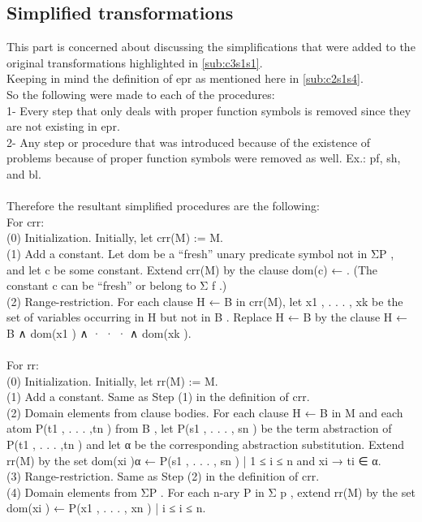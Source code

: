 \subsection{Simplified transformations}\label{sub:c3s1s2}

This part is concerned about discussing the simplifications that were added to the original transformations highlighted in \ref{sub:c3s1s1}.
\\
Keeping in mind the definition of \ac{epr} as mentioned here in \ref{sub:c2s1s4}.
\\
So the following were made to each of the procedures:
\\
1- Every step that only deals with proper function symbols is removed since they are not existing in \ac{epr}.
\\
2- Any step or procedure that was introduced because of the existence of problems because of proper function symbols were removed as well. Ex.: pf, sh, and bl.
\\
\\
Therefore the resultant simplified procedures are the following:
\\
For crr:
\\
(0) Initialization. Initially, let crr(M) := M.
\\
(1) Add a constant. Let dom be a “fresh” unary predicate symbol not in ΣP , and let c
be some constant. Extend crr(M) by the clause dom(c) ← . (The constant c can
be “fresh” or belong to Σ f .)
\\
(2) Range-restriction. For each clause H ← B in crr(M), let {x1 , . . . , xk } be the set of
variables occurring in H but not in B . Replace H ← B by the clause
H ← B ∧ dom(x1 ) ∧ · · · ∧ dom(xk ).
\\
\\
For rr:
\\
(0) Initialization. Initially, let rr(M) := M.
\\
(1) Add a constant. Same as Step (1) in the definition of crr.
\\
(2) Domain elements from clause bodies. For each clause H ← B in M and each atom
P(t1 , . . . ,tn ) from B , let P(s1 , . . . , sn ) be the term abstraction of P(t1 , . . . ,tn ) and let α be the corresponding abstraction substitution. Extend rr(M) by the set
{dom(xi )α ← P(s1 , . . . , sn ) | 1 ≤ i ≤ n and xi → ti ∈ α}.
\\
(3) Range-restriction. Same as Step (2) in the definition of crr.
\\
(4) Domain elements from ΣP . For each n-ary P in Σ p , extend rr(M) by the set
{dom(xi ) ← P(x1 , . . . , xn ) | i ≤ i ≤ n}.


  